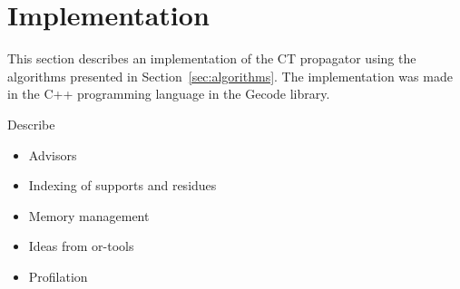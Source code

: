\documentclass[a4paper,11pt]{article}
\newcommand{\Todo}[1]{{\color{blue}#1}}
\newcommand{\Chapref}[1]{Section~\ref{#1}}
\numberwithin{equation}{section}
\begin{document}
\section{Implementation}
\label{sec:implementation}





This section describes an implementation of the CT propagator using the algorithms
presented in \Chapref{sec:algorithms}. The implementation was made in the C++ programming
language in the Gecode library.

\Todo{
  Describe
  \begin{itemize}
    \item Advisors
    \item Indexing of supports and residues
    \item Memory management
    \item Ideas from or-tools
    \item Profilation
  \end{itemize}
}
\end{document}
